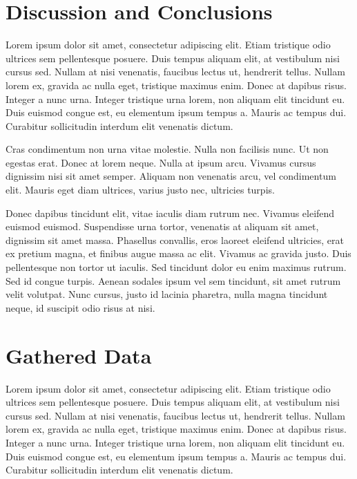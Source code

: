 \documentclass[11pt, a4paper]{resources/JTH}
\begin{document}
\section{Discussion and Conclusions}
\label{chap:DiscussionConclusions}

Lorem ipsum dolor sit amet, consectetur adipiscing elit. Etiam tristique odio ultrices sem pellentesque posuere. Duis tempus aliquam elit, at vestibulum nisi cursus sed. Nullam at nisi venenatis, faucibus lectus ut, hendrerit tellus. Nullam lorem ex, gravida ac nulla eget, tristique maximus enim. Donec at dapibus risus. Integer a nunc urna. Integer tristique urna lorem, non aliquam elit tincidunt eu. Duis euismod congue est, eu elementum ipsum tempus a. Mauris ac tempus dui. Curabitur sollicitudin interdum elit venenatis dictum.

Cras condimentum non urna vitae molestie. Nulla non facilisis nunc. Ut non egestas erat. Donec at lorem neque. Nulla at ipsum arcu. Vivamus cursus dignissim nisi sit amet semper. Aliquam non venenatis arcu, vel condimentum elit. Mauris eget diam ultrices, varius justo nec, ultricies turpis.

Donec dapibus tincidunt elit, vitae iaculis diam rutrum nec. Vivamus eleifend euismod euismod. Suspendisse urna tortor, venenatis at aliquam sit amet, dignissim sit amet massa. Phasellus convallis, eros laoreet eleifend ultricies, erat ex pretium magna, et finibus augue massa ac elit. Vivamus ac gravida justo. Duis pellentesque non tortor ut iaculis. Sed tincidunt dolor eu enim maximus rutrum. Sed id congue turpis. Aenean sodales ipsum vel sem tincidunt, sit amet rutrum velit volutpat. Nunc cursus, justo id lacinia pharetra, nulla magna tincidunt neque, id suscipit odio risus at nisi.




\appendix

\section{Gathered Data}
\label{chap:data}

Lorem ipsum dolor sit amet, consectetur adipiscing elit. Etiam tristique odio ultrices sem pellentesque posuere. Duis tempus aliquam elit, at vestibulum nisi cursus sed. Nullam at nisi venenatis, faucibus lectus ut, hendrerit tellus. Nullam lorem ex, gravida ac nulla eget, tristique maximus enim. Donec at dapibus risus. Integer a nunc urna. Integer tristique urna lorem, non aliquam elit tincidunt eu. Duis euismod congue est, eu elementum ipsum tempus a. Mauris ac tempus dui. Curabitur sollicitudin interdum elit venenatis dictum.
\end{document}
